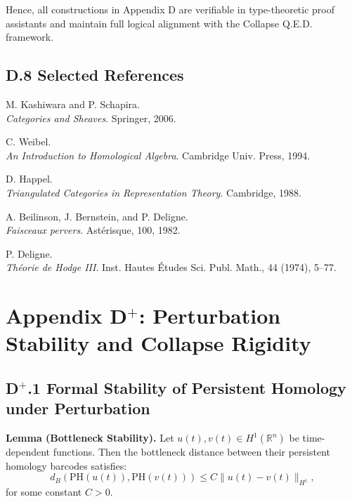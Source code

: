 \documentclass[11pt]{article}
\begin{document}
Hence, all constructions in Appendix D are verifiable in type-theoretic proof assistants and maintain  
full logical alignment with the Collapse Q.E.D. framework.


\subsection*{D.8 Selected References}

\begin{thebibliography}{9}

M. Kashiwara and P. Schapira.\\
\textit{Categories and Sheaves}. Springer, 2006.

C. Weibel.\\
\textit{An Introduction to Homological Algebra}. Cambridge Univ. Press, 1994.

D. Happel.\\
\textit{Triangulated Categories in Representation Theory}. Cambridge, 1988.

A. Beilinson, J. Bernstein, and P. Deligne.\\
\textit{Faisceaux pervers}. Astérisque, 100, 1982.

P. Deligne.\\
\textit{Théorie de Hodge III}. Inst. Hautes Études Sci. Publ. Math., 44 (1974), 5–77.

\end{thebibliography}



\section*{Appendix D$^+$: Perturbation Stability and Collapse Rigidity}

\subsection*{D$^+$.1 Formal Stability of Persistent Homology under Perturbation}
\textbf{Lemma (Bottleneck Stability).}  
Let \( u(t), v(t) \in H^1(\mathbb{R}^n) \) be time-dependent functions. Then the bottleneck distance between their persistent homology barcodes satisfies:
\[
d_B(\mathrm{PH}(u(t)), \mathrm{PH}(v(t))) \leq C \| u(t) - v(t) \|_{H^1},
\]
for some constant \( C > 0 \).
\end{document}
